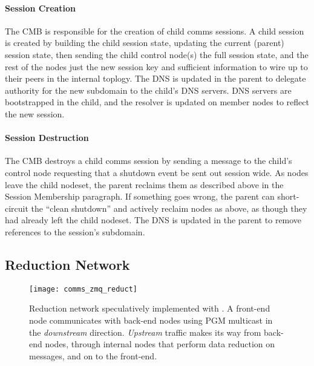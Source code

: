 \paragraph{Session Creation}
The CMB is responsible for the creation of
child comms sessions.
A child session is created by building the child session state,
updating the current (parent) session state, then sending the
child control node(s) the full session state, and the rest of the nodes
just the new session key and sufficient information to wire up to their
peers in the internal toplogy.
The DNS is updated in the parent to delegate authority
for the new subdomain to the child's DNS servers.
DNS servers are bootstrapped in the child, and the resolver is updated
on member nodes to reflect the new session.

\paragraph{Session Destruction}
The CMB destroys a child comms session by sending a message to the child's
control node requesting that a shutdown event be sent out session wide.
As nodes leave the child nodeset, the parent reclaims them as described 
above in the Session Membership paragraph.
If something goes wrong, the parent can short-circuit the ``clean shutdown''
and actively reclaim nodes as above, as though they had already left the
child nodeset.
The DNS is updated in the parent to remove references to the session's
subdomain.

\subsection{Reduction Network}

\begin{figure}
\centering
\texttt{[image: comms\_zmq\_reduct]}
\caption{Reduction network speculatively implemented with \zMQ.
A front-end node communicates with back-end nodes using PGM multicast
in the {\em downstream} direction.  {\em Upstream} traffic makes its
way from back-end nodes, through internal nodes that perform data 
reduction on messages, and on to the front-end.}
\label{FigZmqTBON}
\end{figure}

